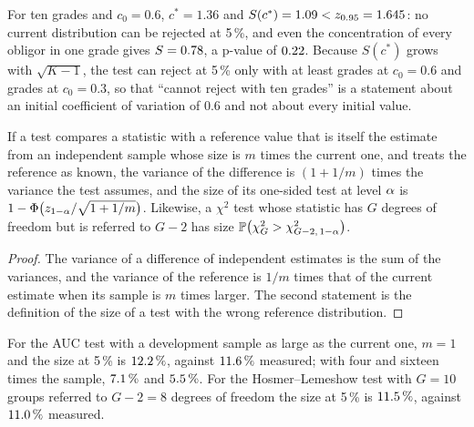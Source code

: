 For ten grades and $c_0=0.6$, $c^*=1.36$ and $S(c^*)=1.09<z_{0.95}=1.645$: no current distribution can be rejected at 5\,\%, and even the concentration of every obligor in one grade gives $S=0.78$, a p-value of $0.22$.
Because $S(c^*)$ grows with $\sqrt{K-1}$, the test can reject at 5\,\% only with at least \hhiKMinSix{} grades at $c_0=0.6$ and \hhiKMinThree{} grades at $c_0=0.3$, so that ``cannot reject with ten grades'' is a statement about an initial coefficient of variation of 0.6 and not about every initial value.

\begin{proposition}
\label{prop:reference}
If a test compares a statistic with a reference value that is itself the estimate from an independent sample whose size is $m$ times the current one, and treats the reference as known, the variance of the difference is $(1+1/m)$ times the variance the test assumes, and the size of its one-sided test at level $\alpha$ is $1-\Phi\big(z_{1-\alpha}/\sqrt{1+1/m}\big)$. Likewise, a $\chi^2$ test whose statistic has $G$ degrees of freedom but is referred to $G-2$ has size $\mathbb{P}\big(\chi^2_G>\chi^2_{G-2,\,1-\alpha}\big)$.
\end{proposition}
\begin{proof}
The variance of a difference of independent estimates is the sum of the variances, and the variance of the reference is $1/m$ times that of the current estimate when its sample is $m$ times larger. The second statement is the definition of the size of a test with the wrong reference distribution.
\end{proof}

For the AUC test with a development sample as large as the current one, $m=1$ and the size at 5\,\% is $12.2\,\%$, against $11.6\,\%$ measured; with four and sixteen times the sample, $7.1\,\%$ and $5.5\,\%$.
For the Hosmer--Lemeshow test with $G=10$ groups referred to $G-2=8$ degrees of freedom the size at 5\,\% is $11.5\,\%$, against $11.0\,\%$ measured.
